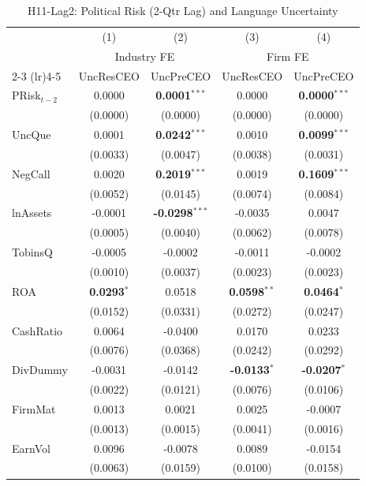 \begin{landscape}
\begin{table}[H]
\setlength{\tabcolsep}{3pt}
\renewcommand{\arraystretch}{0.85}
\centering
\caption{H11-Lag2: Political Risk (2-Qtr Lag) and Language Uncertainty}
\label{tab:h11_lag2}
\scriptsize
\begin{tabular}{lcccc}
\toprule
 & (1) & (2) & (3) & (4) \\
 & \multicolumn{2}{c}{Industry FE} & \multicolumn{2}{c}{Firm FE} \\
\cmidrule(lr){2-3} \cmidrule(lr){4-5}
 & UncResCEO & UncPreCEO & UncResCEO & UncPreCEO \\
\midrule
PRisk$_{t-2}$ & 0.0000 & \textbf{0.0001}$^{***}$ & 0.0000 & \textbf{0.0000}$^{***}$ \\
 & (0.0000) & (0.0000) & (0.0000) & (0.0000) \\
\midrule
UncQue & 0.0001 & \textbf{0.0242}$^{***}$ & 0.0010 & \textbf{0.0099}$^{***}$ \\
 & (0.0033) & (0.0047) & (0.0038) & (0.0031) \\
NegCall & 0.0020 & \textbf{0.2019}$^{***}$ & 0.0019 & \textbf{0.1609}$^{***}$ \\
 & (0.0052) & (0.0145) & (0.0074) & (0.0084) \\
lnAssets & -0.0001 & \textbf{-0.0298}$^{***}$ & -0.0035 & 0.0047 \\
 & (0.0005) & (0.0040) & (0.0062) & (0.0078) \\
TobinsQ & -0.0005 & -0.0002 & -0.0011 & -0.0002 \\
 & (0.0010) & (0.0037) & (0.0023) & (0.0023) \\
ROA & \textbf{0.0293}$^{*}$ & 0.0518 & \textbf{0.0598}$^{**}$ & \textbf{0.0464}$^{*}$ \\
 & (0.0152) & (0.0331) & (0.0272) & (0.0247) \\
CashRatio & 0.0064 & -0.0400 & 0.0170 & 0.0233 \\
 & (0.0076) & (0.0368) & (0.0242) & (0.0292) \\
DivDummy & -0.0031 & -0.0142 & \textbf{-0.0133}$^{*}$ & \textbf{-0.0207}$^{*}$ \\
 & (0.0022) & (0.0121) & (0.0076) & (0.0106) \\
FirmMat & 0.0013 & 0.0021 & 0.0025 & -0.0007 \\
 & (0.0013) & (0.0015) & (0.0041) & (0.0016) \\
EarnVol & 0.0096 & -0.0078 & 0.0089 & -0.0154 \\
 & (0.0063) & (0.0159) & (0.0100) & (0.0158) \\

\end{tabular}
\end{table}
\end{landscape}
